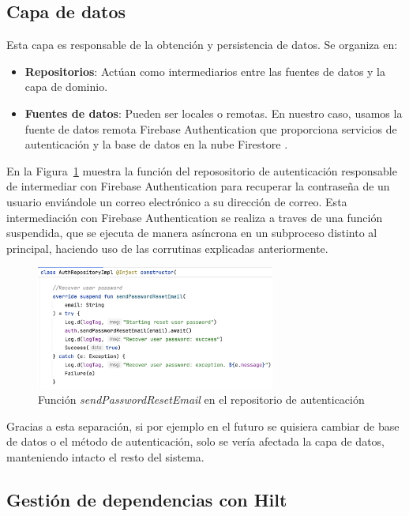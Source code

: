 \subsection{Capa de datos}

Esta capa es responsable de la obtención y persistencia de datos. Se organiza en:

\begin{itemize}
    \item \textbf{Repositorios}: Actúan como intermediarios entre las fuentes de datos y la capa de dominio.
    \item \textbf{Fuentes de datos}: Pueden ser locales o remotas. En nuestro caso, usamos la fuente de datos remota Firebase Authentication que proporciona servicios de autenticación y la base de datos en la nube Firestore \cite{firestore, firebase-auth}.
\end{itemize}

En la Figura~\ref{fig:recoverPassRepo} muestra la función del reposositorio de autenticación responsable de intermediar con Firebase Authentication para recuperar la contraseña de un usuario enviándole un correo electrónico a su dirección de correo. Esta intermediación con Firebase Authentication se realiza a traves de una función suspendida, que se ejecuta de manera asíncrona en un subproceso distinto al principal, haciendo uso de las corrutinas explicadas anteriormente.

\begin{figure}[H]
\centering
\includegraphics[width=0.7\textwidth]{./img/description/recoverPassRepo.png}
\caption{Función \textit{sendPasswordResetEmail} en el repositorio de autenticación}
\label{fig:recoverPassRepo}
\end{figure}

Gracias a esta separación, si por ejemplo en el futuro se quisiera cambiar de base de datos o el método de autenticación, solo se vería afectada la capa de datos, manteniendo intacto el resto del sistema.

\subsection{Gestión de dependencias con Hilt}

